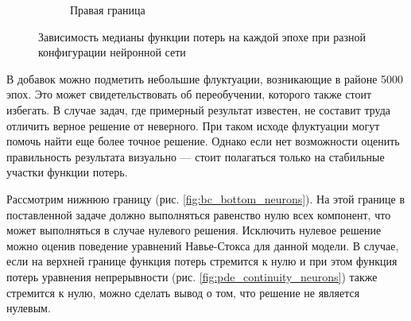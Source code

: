 \begin{figure}[ht]
\begin{subfigure}[b]{0.4\textwidth}
        \caption{Правая граница}
        \label{fig:bc_right_neurons}
    \end{subfigure}
    \caption{Зависимость медианы функции потерь на каждой эпохе при разной конфигурации нейронной сети}
    \label{fig:bc_loss_neurons}
\end{figure}

В добавок можно подметить небольшие флуктуации, возникающие в районе 5000 эпох. Это может свидетельствовать
об переобучении, которого также стоит избегать. В случае задач, где примерный результат известен, не составит
труда отличить верное решение от неверного. При таком исходе флуктуации могут помочь найти еще более
точное решение. Однако если нет возможности оценить правильность результата визуально --- стоит полагаться
только на стабильные участки функции потерь.

Рассмотрим нижнюю границу (рис. \ref{fig:bc_bottom_neurons}). На этой границе в поставленной задаче должно
выполняться равенство нулю всех компонент, что может выполняться в случае нулевого решения. Исключить 
нулевое решение можно оценив поведение уравнений Навье-Стокса для данной модели. В случае, если на верхней
границе функция потерь стремится к нулю и при этом функция потерь уравнения непрерывности (рис. \ref{fig:pde_continuity_neurons})
также стремится к нулю, можно сделать вывод о том, что решение не является нулевым.


